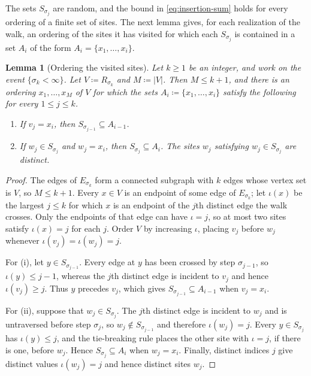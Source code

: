 \documentclass[11pt]{amsart}
\theoremstyle{plain}
\newtheorem{lemma}[theorem]{Lemma}
\theoremstyle{definition}
\begin{document}
	The sets $S_{\sigma_j}$ are random, and the bound in
	\eqref{eq:insertion-sum} holds for every ordering of a finite set of sites.  The next lemma gives, for each realization of the walk, an ordering
	of the sites it has visited for which each $S_{\sigma_j}$ is contained in a
	set $A_i$ of the form $A_i=\{x_1,\ldots,x_i\}$.

	\begin{lemma}[Ordering the visited sites]\label{lem:walk-order}
		Let $k\geq1$ be an integer, and work on the event $\{\sigma_k<\infty\}$.
		Let $V\coloneqq R_{\sigma_k}$ and $M\coloneqq|V|$.  Then $M\leq k+1$, and
		there is an ordering $x_1,\ldots,x_M$ of $V$ for which the sets
		$A_i\coloneqq\{x_1,\ldots,x_i\}$ satisfy the following for every
		$1\leq j\leq k$.
		\begin{enumerate}[label=\textup{(\roman*)}]
			\item If $v_j=x_i$, then $S_{\sigma_{j-1}}\subseteq A_{i-1}$.
			\item If $w_j\in S_{\sigma_j}$ and $w_j=x_i$, then
			$S_{\sigma_j}\subseteq A_i$.  The sites $w_j$ satisfying
			$w_j\in S_{\sigma_j}$ are distinct.
		\end{enumerate}
	\end{lemma}

	\begin{proof}
		The edges of $E_{\sigma_k}$ form a connected subgraph with $k$ edges whose
		vertex set is $V$, so $M\leq k+1$.  Every $x\in V$ is an endpoint of some
		edge of $E_{\sigma_k}$; let $\iota(x)$ be the largest $j\leq k$ for which
		$x$ is an endpoint of the $j$th distinct edge the walk crosses.  Only the
		endpoints of that edge can have $\iota=j$, so at most two sites satisfy $\iota(x)=j$ for each
		$j$.  Order $V$ by increasing $\iota$, placing $v_j$ before $w_j$ whenever
		$\iota(v_j)=\iota(w_j)=j$.

		For (i), let $y\in S_{\sigma_{j-1}}$.  Every edge at $y$ has been crossed by
		step $\sigma_{j-1}$, so $\iota(y)\leq j-1$, whereas the $j$th distinct edge
		is incident to $v_j$ and hence $\iota(v_j)\geq j$.  Thus $y$ precedes $v_j$,
		which gives $S_{\sigma_{j-1}}\subseteq A_{i-1}$ when $v_j=x_i$.

		For (ii), suppose that $w_j\in S_{\sigma_j}$.  The $j$th distinct edge is
		incident to $w_j$ and is untraversed before step $\sigma_j$, so
		$w_j\notin S_{\sigma_{j-1}}$ and therefore $\iota(w_j)=j$.  Every
		$y\in S_{\sigma_j}$ has $\iota(y)\leq j$, and the tie-breaking rule places
		the other site with $\iota=j$, if there is one, before $w_j$.  Hence
		$S_{\sigma_j}\subseteq A_i$ when $w_j=x_i$.  Finally, distinct indices $j$
		give distinct values $\iota(w_j)=j$ and hence distinct sites $w_j$.
	\end{proof}
\end{document}
